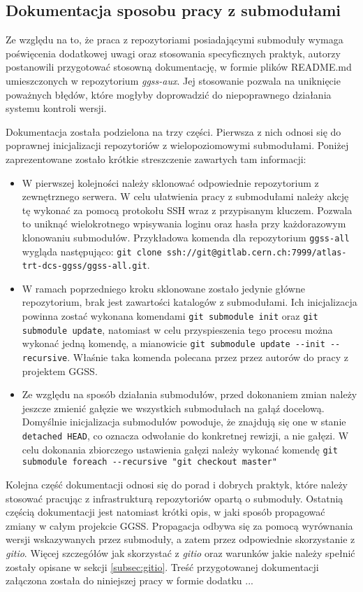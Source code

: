 \subsection{Dokumentacja sposobu pracy z submodułami}
Ze względu na to, że praca z repozytoriami posiadającymi submoduły wymaga poświęcenia dodatkowej uwagi oraz stosowania specyficznych praktyk, autorzy postanowili przygotować stosowną dokumentację, w formie plików README.md umieszczonych w repozytorium \emph{ggss-aux}. Jej stosowanie pozwala na uniknięcie poważnych błędów, które mogłyby doprowadzić do niepoprawnego działania systemu kontroli wersji.

Dokumentacja została podzielona na trzy części. Pierwsza z nich odnosi się do poprawnej inicjalizacji repozytoriów z wielopoziomowymi submodułami. Poniżej zaprezentowane zostało krótkie streszczenie zawartych tam informacji:
\begin{itemize}
    \item W pierwszej kolejności należy sklonować odpowiednie repozytorium z zewnętrznego serwera. W celu ułatwienia pracy z submodułami należy akcję tę wykonać za pomocą protokołu SSH wraz z przypisanym kluczem. Pozwala to uniknąć wielokrotnego wpisywania loginu oraz hasła przy każdorazowym klonowaniu submodułów. Przykładowa komenda dla repozytorium \lstinline{ggss-all} wygląda następująco: \lstinline{git clone ssh://git@gitlab.cern.ch:7999/atlas-trt-dcs-ggss/ggss-all.git}.
    \item W ramach poprzedniego kroku sklonowane zostało jedynie główne repozytorium, brak jest zawartości katalogów z submodułami. Ich inicjalizacja powinna zostać wykonana komendami \lstinline{git submodule init} oraz \lstinline{git submodule update}, natomiast w celu przyspieszenia tego procesu można wykonać jedną komendę, a mianowicie \lstinline{git submodule update --init --recursive}. Właśnie taka komenda polecana przez przez autorów do pracy z projektem GGSS.
    \item Ze względu na sposób działania submodułów, przed dokonaniem zmian należy jeszcze zmienić gałęzie we wszystkich submodułach na gałąź docelową. Domyślnie inicjalizacja submodułów powoduje, że znajdują się one w stanie \lstinline{detached HEAD}, co oznacza odwołanie do konkretnej rewizji, a nie gałęzi. W celu dokonania zbiorczego ustawienia gałęzi należy wykonać komendę \lstinline{git submodule foreach --recursive "git checkout master"}
\end{itemize}

Kolejna część dokumentacji odnosi się do porad i dobrych praktyk, które należy stosować pracując z infrastrukturą repozytoriów opartą o submoduły. Ostatnią częścią dokumentacji jest natomiast krótki opis, w jaki sposób propagować zmiany w całym projekcie GGSS. Propagacja odbywa się za pomocą wyrównania wersji wskazywanych przez submoduły, a zatem przez odpowiednie skorzystanie z \emph{gitio}. Więcej szczegółów jak skorzystać z \emph{gitio} oraz warunków jakie należy spełnić zostały opisane w sekcji \ref{subsec:gitio}. Treść przygotowanej dokumentacji załączona została do niniejszej pracy w formie dodatku ... 
